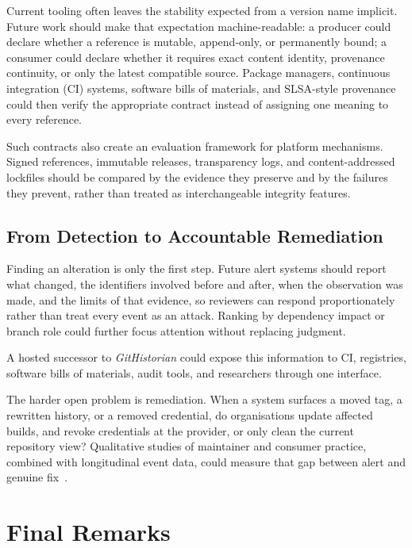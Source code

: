 Current tooling often leaves the stability expected from a version name implicit.
Future work should make that expectation machine-readable: a producer could declare whether a reference is mutable, append-only, or permanently bound; a consumer could declare whether it requires exact content identity, provenance continuity, or only the latest compatible source.
Package managers, continuous integration (CI) systems, software bills of materials, and SLSA-style provenance could then verify the appropriate contract instead of assigning one meaning to every reference.

Such contracts also create an evaluation framework for platform mechanisms.
Signed references, immutable releases, transparency logs, and content-addressed lockfiles should be compared by the evidence they preserve and by the failures they prevent, rather than treated as interchangeable integrity features.

\subsection{From Detection to Accountable Remediation}
\label{subsec:concl-future-developer-behavior}

Finding an alteration is only the first step.
Future alert systems should report what changed, the identifiers involved before and after, when the observation was made, and the limits of that evidence, so reviewers can respond proportionately rather than treat every event as an attack.
Ranking by dependency impact or branch role could further focus attention without replacing judgment.

A hosted successor to \emph{GitHistorian} could expose this information to CI, registries, software bills of materials, audit tools, and researchers through one interface.

The harder open problem is remediation.
When a system surfaces a moved tag, a rewritten history, or a removed credential, do organisations update affected builds, and revoke credentials at the provider, or only clean the current repository view?
Qualitative studies of maintainer and consumer practice, combined with longitudinal event data, could measure that gap between alert and genuine fix~\cite{DBLP:conf/secdev/BasakNRW22}.

\section{Final Remarks}
\label{sec:concl-final}

